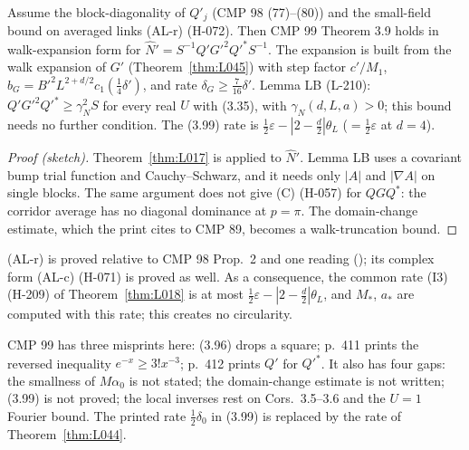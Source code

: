 \begin{theorem}\label{thm:L044}
Assume the block-diagonality of $Q'_j$ (CMP 98 (77)--(80)) and the small-field bound on averaged links (AL-r) (H-072). Then CMP 99 Theorem 3.9 holds in walk-expansion form for $\hat N'=S^{-1}Q'G'^2Q'^*S^{-1}$. The expansion is built from the walk expansion of $G'$ (Theorem~\ref{thm:L045}) with step factor $c'/M_1$, $b_G=B'^2L^{2+d/2}c_1(\tfrac14\delta')$, and rate $\delta_G\ge\frac7{16}\delta'$. Lemma LB (L-210): $Q'G'^2Q'^*\ge\gamma_N^2S$ for every real $U$ with (3.35), with $\gamma_N(d,L,a)>0$; this bound needs no further condition. The (3.99) rate is $\frac12\varepsilon-|2-\frac d2|\theta_L$ ($=\frac12\varepsilon$ at $d=4$).
\end{theorem}
\begin{proof}[Proof (sketch)]
Theorem~\ref{thm:L017} is applied to $\hat N'$. Lemma LB uses a covariant bump trial function and Cauchy--Schwarz, and it needs only $|A|$ and $|\nabla A|$ on single blocks. The same argument does not give (C) (H-057) for $QGQ^*$: the corridor average has no diagonal dominance at $p=\pi$. The domain-change estimate, which the print cites to CMP 89, becomes a walk-truncation bound.
\end{proof}
(AL-r) is proved relative to CMP 98 Prop.~2 and one reading (); its complex form (AL-c) (H-071) is proved as well. As a consequence, the common rate (I3) (H-209) of Theorem~\ref{thm:L018} is at most $\frac12\varepsilon-|2-\frac d2|\theta_L$, and $M_*$, $a_*$ are computed with this rate; this creates no circularity.

\begin{remark}
CMP 99 has three misprints here: (3.96) drops a square; p.~411 prints the reversed inequality $e^{-x}\ge3!x^{-3}$; p.~412 prints $Q'$ for $Q'^*$. It also has four gaps: the smallness of $M\alpha_0$ is not stated; the domain-change estimate is not written; (3.99) is not proved; the local inverses rest on Cors.~3.5--3.6 and the $U=1$ Fourier bound. The printed rate $\frac12\delta_0$ in (3.99) is replaced by the rate of Theorem~\ref{thm:L044}.
\end{remark}

